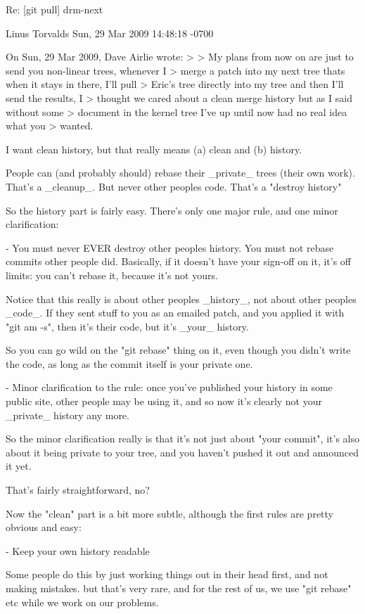 \iniziacode
Re: [git pull] drm-next

Linus Torvalds
Sun, 29 Mar 2009 14:48:18 -0700

On Sun, 29 Mar 2009, Dave Airlie wrote:
>
> My plans from now on are just to send you non-linear trees, whenever I 
> merge a patch into my next tree thats when it stays in there, I'll pull 
> Eric's tree directly into my tree and then I'll send the results, I 
> thought we cared about a clean merge history but as I said without some 
> document in the kernel tree I've up until now had no real idea what you 
> wanted.

I want clean history, but that really means (a) clean and (b) history.

People can (and probably should) rebase their _private_ trees (their own 
work). That's a _cleanup_. But never other peoples code. That's a "destroy 
history"

So the history part is fairly easy. There's only one major rule, and one 
minor clarification:

 - You must never EVER destroy other peoples history. You must not rebase 
   commits other people did. Basically, if it doesn't have your sign-off 
   on it, it's off limits: you can't rebase it, because it's not yours.

   Notice that this really is about other peoples _history_, not about 
   other peoples _code_. If they sent stuff to you as an emailed patch, 
   and you applied it with "git am -s", then it's their code, but it's 
   _your_ history.

   So you can go wild on the "git rebase" thing on it, even though you 
   didn't write the code, as long as the commit itself is your private 
   one.

 - Minor clarification to the rule: once you've published your history in 
   some public site, other people may be using it, and so now it's clearly 
   not your _private_ history any more.

   So the minor clarification really is that it's not just about "your 
   commit", it's also about it being private to your tree, and you haven't 
   pushed it out and announced it yet.

That's fairly straightforward, no?

Now the "clean" part is a bit more subtle, although the first rules are 
pretty obvious and easy:

 - Keep your own history readable

   Some people do this by just working things out in their head first, and 
   not making mistakes. but that's very rare, and for the rest of us, we 
   use "git rebase" etc while we work on our problems. 

